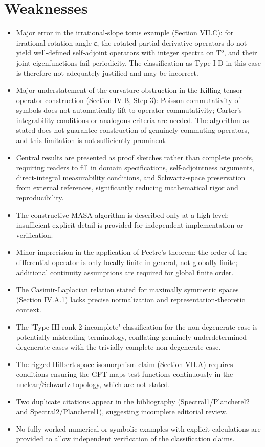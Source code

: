 \documentclass[11pt]{article}
\begin{document}
\section*{Weaknesses}
\begin{itemize}[leftmargin=*]
  \item Major error in the irrational-slope torus example (Section VII.C): for irrational rotation angle ε, the rotated partial-derivative operators do not yield well-defined self-adjoint operators with integer spectra on T², and their joint eigenfunctions fail periodicity. The classification as Type I-D in this case is therefore not adequately justified and may be incorrect.
  \item Major understatement of the curvature obstruction in the Killing-tensor operator construction (Section IV.B, Step 3): Poisson commutativity of symbols does not automatically lift to operator commutativity; Carter's integrability conditions or analogous criteria are needed. The algorithm as stated does not guarantee construction of genuinely commuting operators, and this limitation is not sufficiently prominent.
  \item Central results are presented as proof sketches rather than complete proofs, requiring readers to fill in domain specifications, self-adjointness arguments, direct-integral measurability conditions, and Schwartz-space preservation from external references, significantly reducing mathematical rigor and reproducibility.
  \item The constructive MASA algorithm is described only at a high level; insufficient explicit detail is provided for independent implementation or verification.
  \item Minor imprecision in the application of Peetre's theorem: the order of the differential operator is only locally finite in general, not globally finite; additional continuity assumptions are required for global finite order.
  \item The Casimir-Laplacian relation stated for maximally symmetric spaces (Section IV.A.1) lacks precise normalization and representation-theoretic context.
  \item The 'Type III rank-2 incomplete' classification for the non-degenerate case is potentially misleading terminology, conflating genuinely underdetermined degenerate cases with the trivially complete non-degenerate case.
  \item The rigged Hilbert space isomorphism claim (Section VII.A) requires conditions ensuring the GFT maps test functions continuously in the nuclear/Schwartz topology, which are not stated.
  \item Two duplicate citations appear in the bibliography (Spectral1/Plancherel2 and Spectral2/Plancherel1), suggesting incomplete editorial review.
  \item No fully worked numerical or symbolic examples with explicit calculations are provided to allow independent verification of the classification claims.
\end{itemize}
\end{document}
